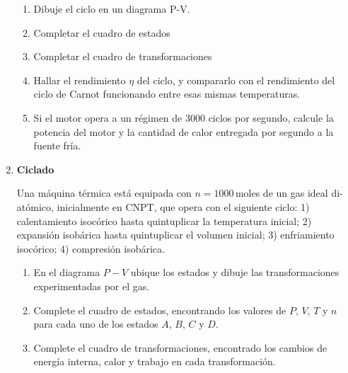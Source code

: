 \documentclass[a4paper,12pt]{article}
\begin{document}
\begin{enumerate}
		\begin{enumerate}
			\item Dibuje el ciclo en un diagrama P-V.
			\item Completar el cuadro de estados 
			\item Completar el cuadro de transformaciones
			\item Hallar el rendimiento $\eta$ del ciclo, y compararlo con el
				rendimiento del ciclo de Carnot funcionando entre esas mismas
				temperaturas.
			\item Si el motor opera a un régimen de $3000$ ciclos por segundo,
				calcule la potencia del motor y la cantidad de calor entregada
				por segundo a la fuente fría.
		\end{enumerate}
	
	\item {\bf{Ciclado}}
		
		Una máquina térmica está equipada con $n=1000$\,moles de un gas ideal
		di-atómico, inicialmente en CNPT, que opera con el siguiente ciclo: 1)
		calentamiento isocórico hasta quintuplicar la temperatura inicial; 2)
		expansión isobárica hasta quintuplicar el volumen inicial; 3)
		enfriamiento isocórico; 4) compresión isobárica.
		
		\begin{enumerate}
			\item En el diagrama $P-V$ ubique los estados y dibuje las
				transformaciones experimentadas por el gas.
			\item Complete el cuadro de estados, encontrando los valores de
				$P$, $V$, $T$ y $n$ para cada uno de los estados $A$, $B$, $C$
				y $D$. 
			\item Complete el cuadro de transformaciones, encontrado los
				cambios de energía interna, calor y trabajo en cada
				transformación.
		\end{enumerate}
\end{enumerate}
\end{document}
